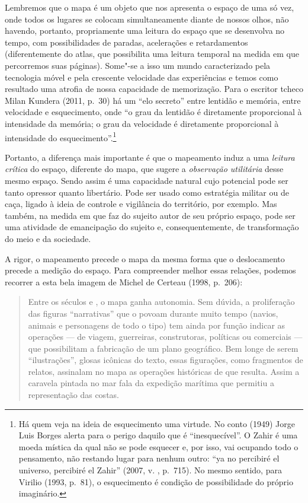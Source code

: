 Lembremos que o mapa é um objeto que nos apresenta o espaço de uma só
vez, onde todos os lugares se colocam simultaneamente diante de nossos
olhos, não havendo, portanto, propriamente uma leitura do espaço que se
desenvolva no tempo, com possibilidades de paradas, acelerações e
retardamentos (diferentemente do atlas, que possibilita uma leitura
temporal na medida em que percorremos suas páginas). Some"-se a isso um
mundo caracterizado pela tecnologia móvel e pela crescente velocidade
das experiências e temos como resultado uma atrofia de nossa capacidade
de memorização. Para o escritor tcheco Milan Kundera (2011, p.~30) há um
``elo secreto'' entre lentidão e memória, entre velocidade e
esquecimento, onde ``o grau da lentidão é diretamente proporcional à
intensidade da memória; o grau da velocidade é diretamente
proporcional à intensidade do esquecimento''.\footnote{Há quem veja na
  ideia de esquecimento uma virtude. No conto {} (1949)
  Jorge Luis Borges alerta para o perigo daquilo que é ``inesquecível''.
  O Zahir é uma moeda mística da qual não se pode esquecer e, por isso,
  vai ocupando todo o pensamento, não restando lugar para nenhum outro:
  ``ya no percibiré el universo, percibiré el Zahir'' (2007, v. , p.~715). No mesmo sentido, para Virilio (1993, p.~81), o esquecimento é
  condição de possibilidade do próprio imaginário.}

Portanto, a diferença mais importante é que o mapeamento induz a uma
\emph{leitura crítica} do espaço, diferente do mapa, que sugere a
\emph{observação utilitária} desse mesmo espaço. Sendo assim é uma capacidade natural cujo potencial pode ser tanto opressor quanto libertário. Pode ser usado como estratégia militar ou de caça, ligado à ideia de controle e vigilância do território, por exemplo. Mas também, na medida em que faz do sujeito autor de seu próprio espaço, pode ser uma atividade de emancipação do sujeito e, consequentemente, de transformação do meio e da sociedade.

A rigor, o mapeamento precede o mapa da mesma forma que o deslocamento
precede a medição do espaço. Para compreender melhor essas relações,
podemos recorrer a esta bela imagem de Michel de Certeau (1998, p.~206):

\begin{quote}
Entre os séculos  e , o mapa ganha autonomia. Sem dúvida, a
proliferação das figuras ``narrativas'' que o povoam durante muito tempo
(navios, animais e personagens de todo o tipo) tem ainda por função
indicar as operações --- de viagem, guerreiras, construtoras, políticas
ou comerciais --- que possibilitam a fabricação de um plano geográfico.
Bem longe de serem ``ilustrações'', glosas icônicas do texto, essas
figurações, como fragmentos de relatos, assinalam no mapa as operações
históricas de que resulta. Assim a caravela pintada no mar fala da
expedição marítima que permitiu a representação das costas.
\end{quote}

